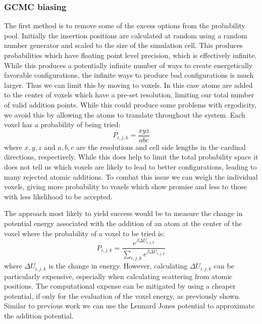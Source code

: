 \subsubsection{GCMC biasing}
The first method is to remove some of the excess options from the probability pool.
Initially the insertion positions are calculated at random using a random number generator and scaled to the size of the simulation cell.
This produces probabilities which have floating point level precision, which is effectively infinite.
While this produces a potentially infinite number of ways to create energetically favorable configurations, the infinite ways to produce bad configurations is much larger.
Thus we can limit this by moving to voxels.
In this case atoms are added to the center of voxels which have a pre-set resolution, limiting our total number of valid addition points.
While this could produce some problems with ergodicity, we avoid this by allowing the atoms to translate throughout the system.
Each voxel has a probability of being tried:
\begin{equation}
  P_{i, j, k} = \frac{x y z}{a b c}
\end{equation}
where $x, y, z$ and $a, b, c$ are the resolutions and cell side lengths in the cardinal directions, respectively.
While this does help to limit the total probability space it does not tell us which voxels are likely to lead to better configurations, leading to many rejected atomic additions.
To combat this issue we can weigh the individual voxels, giving more probability to voxels which show promise and less to those with less likelihood to be accepted.

The approach most likely to yield success would be to measure the change in potential energy associated with the addition of an atom at the center of the voxel where the probability of a voxel to be tried is:
\begin{equation}
  P_{i, j, k} = \frac{e^{\beta \Delta U_{i, j, k}}}{\sum_{i, j, k}e^{\beta \Delta U_{i, j, k}}}
\end{equation}
where $\Delta U_{i, j, k}$ is the change in energy.
However, calculating $\Delta U_{i, j, k}$ can be particularly expensive, especially when calculating scattering from atomic positions.
The computational expense can be mitigated by using a cheaper potential, if only for the evaluation of the voxel energy, as previously shown.
Similar to previous work we can use the Lennard Jones potential to approximate the addition potential.
